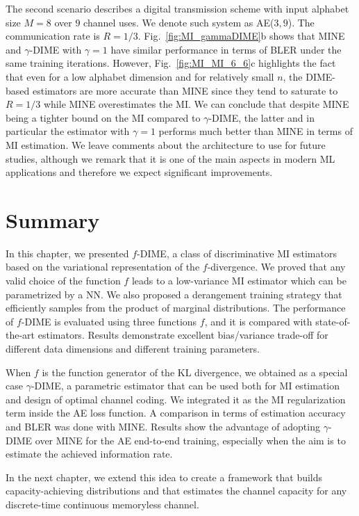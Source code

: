 The second scenario describes a digital transmission scheme with input alphabet size $M=8$ over $9$ channel uses. We denote such system as AE($3,9$). The communication rate is $R=1/3$. Fig.~\ref{fig:MI_gammaDIME}b shows that MINE and $\gamma$-DIME with $\gamma=1$ have similar performance in terms of BLER under the same training iterations. However, Fig.~\ref{fig:MI_MI_6_6}c highlights the fact that even for a low alphabet dimension and for relatively small $n$, the DIME-based estimators are more accurate than MINE since they tend to saturate to $R=1/3$ while MINE overestimates the MI. We can conclude that despite MINE being a tighter bound on the MI compared to $\gamma$-DIME, the latter and in particular the estimator with $\gamma=1$ performs much better than MINE in terms of MI estimation. We leave comments about the architecture to use for future studies, although we remark that it is one of the main aspects in modern ML applications and therefore we expect significant improvements. 

\section{Summary}
\label{sec:mi_conclusions}
In this chapter, we presented $f$-DIME, a class of discriminative MI estimators based on the variational representation of the $f$-divergence. We proved that any valid choice of the function $f$ leads to a low-variance MI estimator which can be parametrized by a NN. We also proposed a derangement training strategy that efficiently samples from the product of marginal distributions. 
The performance of $f$-DIME is evaluated using three functions $f$, and it is compared with state-of-the-art estimators. Results demonstrate excellent bias/variance trade-off for different data dimensions and different training parameters.

When $f$ is the function generator of the KL divergence, we obtained as a special case $\gamma$-DIME, a parametric estimator that can be used both for MI estimation and design of optimal channel coding. We integrated it as the MI regularization term inside the AE loss
function. A comparison in terms of estimation accuracy and
BLER was done with MINE. Results show the advantage of adopting $\gamma$-DIME over MINE for the AE end-to-end training, especially when the aim is to estimate the achieved information rate. 

In the next chapter, we extend this idea to create a framework that builds capacity-achieving distributions and that estimates the channel capacity for any discrete-time continuous memoryless channel.

